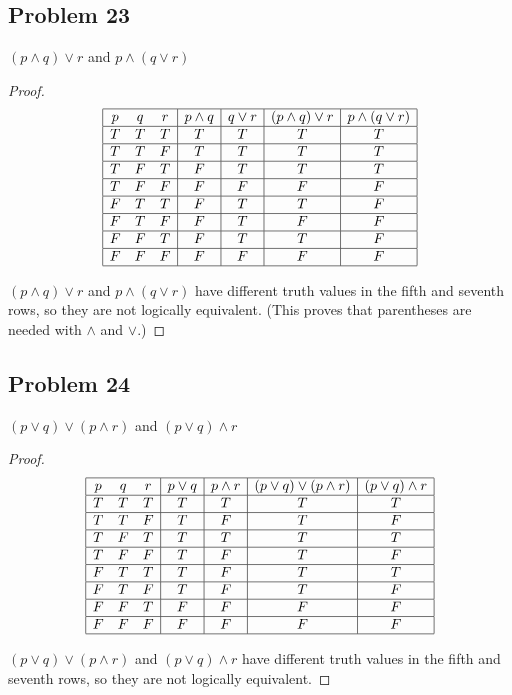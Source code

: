 \documentclass[14pt]{extarticle}
\begin{document}
\subsection{Problem 23}
$(p \wedge q) \vee r$ and $p \wedge (q \vee r)$

\begin{proof}
$$
\begin{array}{|ccc|c|c|c|c|}
\hline
p & q & r & p \wedge q & q \vee r & (p \wedge q) \vee r & p \wedge (q \vee r)
\\\hline
T & T & T & T & T & T & T \\
\hline
T & T & F & T & T & T & T \\
\hline
T & F & T & F & T & T & T \\
\hline
T & F & F & F & F & F & F \\
\hline
F & T & T & F & T & T & F \\
\hline
F & T & F & F & T & F & F \\
\hline
F & F & T & F & T & T & F \\
\hline
F & F & F & F & F & F & F \\
\hline
\end{array}
$$

$(p \wedge q) \vee r$ and $p \wedge (q \vee r)$ have different truth values in the fifth and seventh rows, so they are not logically equivalent. (This proves that parentheses are needed with $\wedge$ and $\vee$.)
\end{proof}

\subsection{Problem 24}
$(p \vee q) \vee (p \wedge r)$ and $(p \vee q) \wedge r$

\begin{proof}
$$
\begin{array}{|ccc|c|c|c|c|}
\hline
p & q & r & p \vee q & p \wedge r & (p \vee q) \vee (p \wedge r) &
(p \vee q) \wedge r \\
\hline
T & T & T & T & T & T & T \\
\hline
T & T & F & T & F & T & F \\
\hline
T & F & T & T & T & T & T \\
\hline
T & F & F & T & F & T & F \\
\hline
F & T & T & T & F & T & T \\
\hline
F & T & F & T & F & T & F \\
\hline
F & F & T & F & F & F & F \\
\hline
F & F & F & F & F & F & F \\
\hline
\end{array}
$$

$(p \vee q) \vee (p \wedge r)$ and $(p \vee q) \wedge r$ have different truth values in the fifth and seventh rows, so they are not logically equivalent.
\end{proof}
\end{document}
